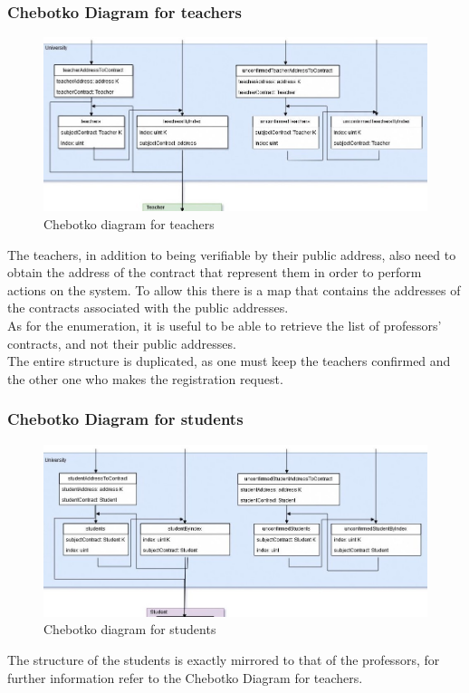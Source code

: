 \documentclass[ManualeSviluppatore]{subfiles}
\begin{document}
\subsubsection{Chebotko Diagram for teachers}
\begin{figure}[H]
	\centering
	\includegraphics[width=1\linewidth]{"diagrammi/chebotko/teacher"}
	\caption{Chebotko diagram for teachers}
	\label{fig:Chebotko diagram for teachers}
\end{figure}
The teachers, in addition to being verifiable by their public address, also need to obtain the address of the contract that represent them in order to perform actions on the system.
To allow this there is a map that contains the addresses of the contracts associated with the public addresses. \\
As for the enumeration, it is useful to be able to retrieve the list of professors' contracts, and not their public addresses. \\
The entire structure is duplicated, as one must keep the teachers confirmed and the other one who makes the registration request. \\

\subsubsection{Chebotko Diagram for students}
\begin{figure}[H]
	\centering
	\includegraphics[width=1\linewidth]{"diagrammi/chebotko/student"}
	\caption{Chebotko diagram for students}
	\label{fig:Chebotko diagram for students}
\end{figure}
The structure of the students is exactly mirrored to that of the professors, for further information refer to the Chebotko Diagram for teachers.
\end{document}
